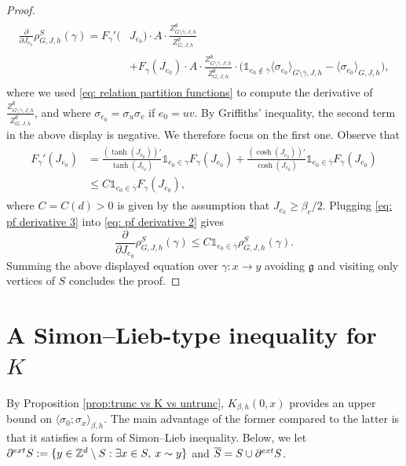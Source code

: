 \documentclass[10pt,a4paper]{amsart}
\numberwithin{equation}{section}
\begin{document}
\begin{proof}
\begin{align}
\begin{aligned}
	\frac{\partial}{\partial J_{e_0}}\rho_{G,J,h}^S(\gamma)=
	F_\gamma'(&J_{e_0})\cdot A \cdot \frac{Z_{G\setminus \overline{\gamma},J,h}^\emptyset}{Z_{G,J,h}^\emptyset}
	\\&+F_\gamma(J_{e_0})\cdot A \cdot \frac{Z_{G\setminus \overline{\gamma},J,h}^\emptyset}{Z_{G,J,h}^\emptyset}\cdot \Big(\mathds{1}_{e_0\notin\overline{\gamma}}\langle \sigma_{e_0}\rangle_{G\setminus\overline{\gamma},J,h}-\langle \sigma_{e_0}\rangle_{G,J,h}\Big),
	\end{aligned}
\end{align}
where we used \eqref{eq: relation partition functions} to compute the derivative of $\tfrac{Z_{G\setminus \overline{\gamma},J,h}^\emptyset}{Z_{G,J,h}^\emptyset}$, and where $\sigma_{e_0}=\sigma_u\sigma_v$ if $e_0=uv$. By Griffiths' inequality, the second term in the above display is negative. We therefore focus on the first one. Observe that
\begin{align}\label{eq: pf derivative 3}
\begin{aligned}
F_\gamma'(J_{e_0})&=\frac{(\tanh(J_{e_0}))'}{\tanh(J_{e_0})}\mathds{1}_{e_0\in \gamma}F_\gamma(J_{e_0})+\frac{(\cosh(J_{e_0}))'}{\cosh(J_{e_0})}\mathds{1}_{e_0\in \overline{\gamma}}F_\gamma(J_{e_0})
\\&\leq C \mathds{1}_{e_0\in \overline{\gamma}}F_\gamma(J_{e_0}),
\end{aligned}
\end{align}
where $C=C(d)>0$ is given by the assumption that $J_{e_0}\geq \beta_c/2$. Plugging \eqref{eq: pf derivative 3} into \eqref{eq: pf derivative 2} gives
\begin{equation}
	\frac{\partial}{\partial J_{e_0}}\rho_{G,J,h}^S(\gamma)\leq C\mathds{1}_{e_0\in \overline{\gamma}}\rho^S_{G,J,h}(\gamma).
\end{equation}
Summing the above displayed equation over $\gamma:x\rightarrow y$ avoiding $\mathfrak{g}$ and visiting only vertices of $S$ concludes the proof.
\end{proof}




\section{A Simon--Lieb-type inequality for $K$}\label{sec:SL for K}
By Proposition \ref{prop:trunc vs K vs untrunc}, $K_{\beta,h}(0,x)$ provides an upper bound on $\langle\sigma_0;\sigma_x\rangle_{\beta,h}$. The main advantage of the former compared to the latter is that it satisfies a form of Simon--Lieb inequality. Below, we let $\partial^{\textup{ext}}S:=\{y\in \mathbb Z^d\setminus S: \exists x\in S, \: x\sim y\}$ and $\overline{S}=S\cup \partial^{\textup{ext}}S$.
\end{document}

